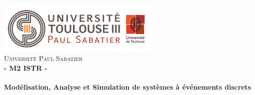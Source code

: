 



\begin{titlepage}
\begin{center}


\includegraphics[width=0.60\textwidth]{./Page_de_garde/logo_ups.png}~\\[1cm]

\textsc{\LARGE Université Paul Sabatier}\\[1.5cm]

\textsc{\Large \bf - M2 ISTR -}\\[0.5cm]

\HRule \\[0.4cm]

{\huge \bfseries  Modélisation, Analyse et Simulation de systèmes à
événements discrets}
\HRule \\[1.5cm]


\end{center}
\end{titlepage}
